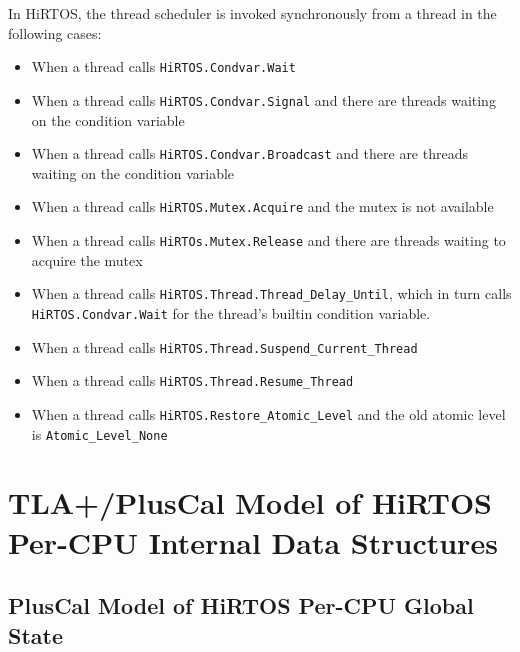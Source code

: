 \documentclass[sigplan,anonymous,10pt]{acmart}
\begin{document}
In HiRTOS, the thread scheduler is invoked synchronously from a thread
in the following cases:

\begin{itemize}
\item When a thread calls \verb`HiRTOS.Condvar.Wait`
\item When a thread calls \verb`HiRTOS.Condvar.Signal` 
      and there are threads waiting on the condition variable
\item When a thread calls \verb`HiRTOS.Condvar.Broadcast`
      and there are threads waiting on the condition variable     
\item When a thread calls \verb`HiRTOS.Mutex.Acquire` and the mutex is not available
\item When a thread calls \verb`HiRTOs.Mutex.Release` and there are threads waiting
      to acquire the mutex
\item When a thread calls \verb`HiRTOS.Thread.Thread_Delay_Until`, which in turn calls
      \verb`HiRTOS.Condvar.Wait` for the thread's builtin condition variable.
\item When a thread calls \verb`HiRTOS.Thread.Suspend_Current_Thread`
\item When a thread calls \verb`HiRTOS.Thread.Resume_Thread`
\item When a thread calls \verb`HiRTOS.Restore_Atomic_Level` and the old atomic level is
      \verb`Atomic_Level_None`
\end{itemize}

\section{TLA+/PlusCal Model of HiRTOS Per-CPU Internal Data Structures}

\subsection{PlusCal Model of HiRTOS Per-CPU Global State}
\end{document}
